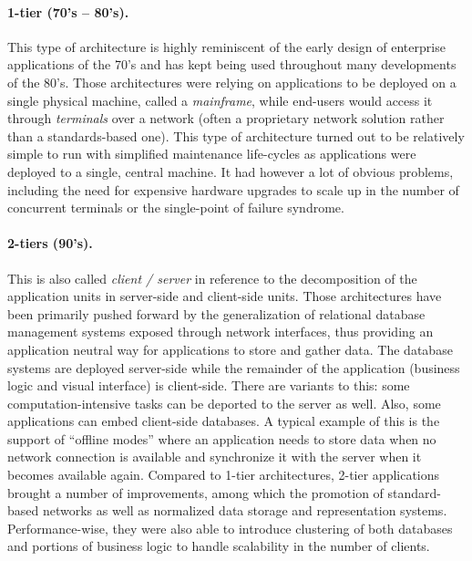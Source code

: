 \paragraph{1-tier (70's -- 80's).}
This type of architecture is highly reminiscent of the early design of enterprise applications of the 70's and has kept being used throughout many developments of the 80's. Those architectures were relying on applications to be deployed on a single physical machine, called a \emph{mainframe}, while end-users would access it through \emph{terminals} over a network (often a proprietary network solution rather than a standards-based one). This type of architecture turned out to be relatively simple to run with simplified maintenance life-cycles as applications were deployed to a single, central machine. It had however a lot of obvious problems, including the need for expensive hardware upgrades to scale up in the number of concurrent terminals or the single-point of failure syndrome.

\paragraph{2-tiers (90's).}
This is also called \emph{client / server} in reference to the decomposition of the application units in server-side and client-side units. Those architectures have been primarily pushed forward by the generalization of relational database management systems exposed through network interfaces, thus providing an application neutral way for applications to store and gather data. The database systems are deployed server-side while the remainder of the application (business logic and visual interface) is client-side. There are variants to this: some computation-intensive tasks can be deported to the server as well. Also, some applications can embed client-side databases. A typical example of this is the support of ``offline modes'' where an application needs to store data when no network connection is available and synchronize it with the server when it becomes available again. Compared to 1-tier architectures, 2-tier applications brought a number of improvements, among which the promotion of standard-based networks as well as normalized data storage and representation systems. Performance-wise, they were also able to introduce clustering of both databases and portions of business logic to handle scalability in the number of clients.

